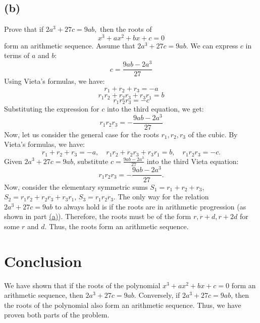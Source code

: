 \documentclass{article}
\begin{document}
\subsection{(b)}
Prove that if $2a^3 + 27c = 9ab,$ then the roots of
\[x^3 + ax^2 + bx + c = 0\]
form an arithmetic sequence.
Assume that $2a^3 + 27c = 9ab$. We can express $c$ in terms of $a$ and $b$:
\[c = \frac{9ab - 2a^3}{27}\]
Using Vieta's formulas, we have:
\[
r_1 + r_2 + r_3 = -a
\]
\[
r_1r_2 + r_2r_3 + r_3r_1 = b
\]
\[
r_1r_2r_3 = -c
\]
Substituting the expression for $c$ into the third equation, we get:
\[
r_1r_2r_3 = -\frac{9ab - 2a^3}{27}
\]
Now, let us consider the general case for the roots $r_1, r_2, r_3$ of the cubic. By Vieta's formulas, we have:
\[
r_1 + r_2 + r_3 = -a, \quad r_1r_2 + r_2r_3 + r_3r_1 = b, \quad r_1r_2r_3 = -c.
\]
Given $2a^3 + 27c = 9ab$, substitute $c = \frac{9ab - 2a^3}{27}$ into the third Vieta equation:
\[
r_1r_2r_3 = -\frac{9ab - 2a^3}{27}.
\]
Now, consider the elementary symmetric sums $S_1 = r_1 + r_2 + r_3$, $S_2 = r_1r_2 + r_2r_3 + r_3r_1$, $S_3 = r_1r_2r_3$. The only way for the relation $2a^3 + 27c = 9ab$ to always hold is if the roots are in arithmetic progression (as shown in part \hyperref[eq:part_a]{(a)}). Therefore, the roots must be of the form $r, r+d, r+2d$ for some $r$ and $d$. Thus, the roots form an arithmetic sequence.

\section{Conclusion}
We have shown that if the roots of the polynomial $x^3 + ax^2 + bx + c = 0$ form an arithmetic sequence, then $2a^3 + 27c = 9ab$. Conversely, if $2a^3 + 27c = 9ab$, then the roots of the polynomial also form an arithmetic sequence. Thus, we have proven both parts of the problem.
\end{document}
